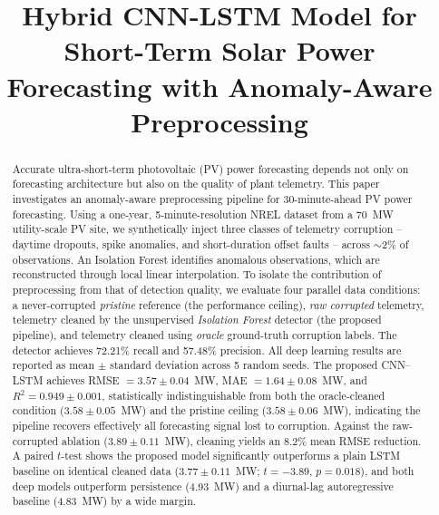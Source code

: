 \documentclass[conference]{IEEEtran}
\begin{document}
\title{Hybrid CNN-LSTM Model for Short-Term Solar Power Forecasting with Anomaly-Aware Preprocessing}

\author{
\and
{}
}

\maketitle

\begin{abstract}
Accurate ultra-short-term photovoltaic (PV) power forecasting depends not only on forecasting architecture but also on the quality of plant telemetry. This paper investigates an anomaly-aware preprocessing pipeline for 30-minute-ahead PV power forecasting. Using a one-year, 5-minute-resolution NREL dataset from a 70~MW utility-scale PV site, we synthetically inject three classes of telemetry corruption -- daytime dropouts, spike anomalies, and short-duration offset faults -- across $\sim$2\% of observations. An Isolation Forest identifies anomalous observations, which are reconstructed through local linear interpolation. To isolate the contribution of preprocessing from that of detection quality, we evaluate four parallel data conditions: a never-corrupted \emph{pristine} reference (the performance ceiling), \emph{raw corrupted} telemetry, telemetry cleaned by the unsupervised \emph{Isolation Forest} detector (the proposed pipeline), and telemetry cleaned using \emph{oracle} ground-truth corruption labels. The detector achieves 72.21\% recall and 57.48\% precision. All deep learning results are reported as mean $\pm$ standard deviation across 5 random seeds. The proposed CNN--LSTM achieves RMSE $= 3.57 \pm 0.04$~MW, MAE $= 1.64 \pm 0.08$~MW, and $R^2 = 0.949 \pm 0.001$, statistically indistinguishable from both the oracle-cleaned condition ($3.58 \pm 0.05$~MW) and the pristine ceiling ($3.58 \pm 0.06$~MW), indicating the pipeline recovers effectively all forecasting signal lost to corruption. Against the raw-corrupted ablation ($3.89 \pm 0.11$~MW), cleaning yields an 8.2\% mean RMSE reduction. A paired $t$-test shows the proposed model significantly outperforms a plain LSTM baseline on identical cleaned data ($3.77 \pm 0.11$~MW; $t = -3.89$, $p = 0.018$), and both deep models outperform persistence (4.93~MW) and a diurnal-lag autoregressive baseline (4.83~MW) by a wide margin.
\end{abstract}
\end{document}
